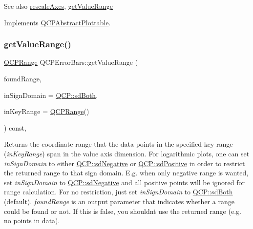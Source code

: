 \begin{DoxySeeAlso}{See also}
\mbox{\hyperlink{class_q_c_p_abstract_plottable_a1491c4a606bccd2d09e65e11b79eb882}{rescale\+Axes}}, \mbox{\hyperlink{class_q_c_p_error_bars_ab76215a186ae4862235821e028685f26}{get\+Value\+Range}} 
\end{DoxySeeAlso}


Implements \mbox{\hyperlink{class_q_c_p_abstract_plottable_a4da16d3cd4b509e1104a9b0275623c96}{Q\+C\+P\+Abstract\+Plottable}}.

\mbox{\label{class_q_c_p_error_bars_ab76215a186ae4862235821e028685f26}} 
\subsubsection{\texorpdfstring{getValueRange()}{getValueRange()}}
{\footnotesize\ttfamily \mbox{\hyperlink{class_q_c_p_range}{Q\+C\+P\+Range}} Q\+C\+P\+Error\+Bars\+::get\+Value\+Range (\begin{DoxyParamCaption}\item[{bool \&}]{found\+Range,  }\item[{\mbox{\hyperlink{namespace_q_c_p_afd50e7cf431af385614987d8553ff8a9}{Q\+C\+P\+::\+Sign\+Domain}}}]{in\+Sign\+Domain = {\ttfamily \mbox{\hyperlink{namespace_q_c_p_afd50e7cf431af385614987d8553ff8a9aa38352ef02d51ddfa4399d9551566e24}{Q\+C\+P\+::sd\+Both}}},  }\item[{const \mbox{\hyperlink{class_q_c_p_range}{Q\+C\+P\+Range}} \&}]{in\+Key\+Range = {\ttfamily \mbox{\hyperlink{class_q_c_p_range}{Q\+C\+P\+Range}}()} }\end{DoxyParamCaption}) const\hspace{0.3cm}{\ttfamily [protected]}, {\ttfamily [virtual]}}

Returns the coordinate range that the data points in the specified key range ({\itshape in\+Key\+Range}) span in the value axis dimension. For logarithmic plots, one can set {\itshape in\+Sign\+Domain} to either \mbox{\hyperlink{namespace_q_c_p_afd50e7cf431af385614987d8553ff8a9a2d18af0bc58f6528d1e82ce699fe4829}{Q\+C\+P\+::sd\+Negative}} or \mbox{\hyperlink{namespace_q_c_p_afd50e7cf431af385614987d8553ff8a9a584784b75fb816abcc627cf743bb699f}{Q\+C\+P\+::sd\+Positive}} in order to restrict the returned range to that sign domain. E.\+g. when only negative range is wanted, set {\itshape in\+Sign\+Domain} to \mbox{\hyperlink{namespace_q_c_p_afd50e7cf431af385614987d8553ff8a9a2d18af0bc58f6528d1e82ce699fe4829}{Q\+C\+P\+::sd\+Negative}} and all positive points will be ignored for range calculation. For no restriction, just set {\itshape in\+Sign\+Domain} to \mbox{\hyperlink{namespace_q_c_p_afd50e7cf431af385614987d8553ff8a9aa38352ef02d51ddfa4399d9551566e24}{Q\+C\+P\+::sd\+Both}} (default). {\itshape found\+Range} is an output parameter that indicates whether a range could be found or not. If this is false, you shouldn\textquotesingle{}t use the returned range (e.\+g. no points in data).

